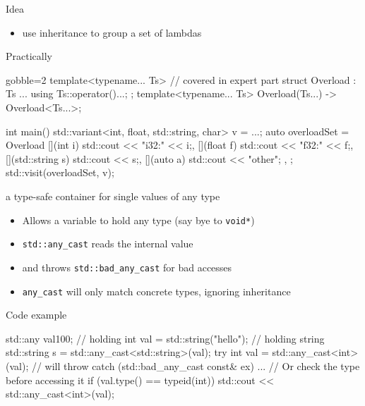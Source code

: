\begin{frame}[fragile]
  \begin{exampleblock}{Idea}
    \begin{itemize}
    \item use inheritance to group a set of lambdas
    \end{itemize}
  \end{exampleblock}
  \begin{block}{Practically}
    \small
    \begin{cppcode*}{gobble=2}
      template<typename... Ts> // covered in expert part
      struct Overload : Ts ... { using Ts::operator()...; };
      template<typename... Ts> Overload(Ts...) -> Overload<Ts...>;

      int main(){
        std::variant<int, float, std::string, char> v = ...;
        auto overloadSet = Overload {
          [](int i) { std::cout << "i32:" << i;},
          [](float f) { std::cout << "f32:" << f;},
          [](std::string s) { std::cout << s;},
          [](auto a) { std::cout << "other"; },
        };
        std::visit(overloadSet, v);
      }
    \end{cppcode*}
  \end{block}
\end{frame}

\begin{frame}[fragile]
  \begin{block}{a type-safe container for single values of any type}
    \begin{itemize}
    \item Allows a variable to hold any type (say bye to \texttt{void*})
    \item \texttt{std::any_cast} reads the internal value
    \item and throws \texttt{std::bad_any_cast} for bad accesses
    \item \texttt{any_cast} will only match concrete types, ignoring inheritance
    \end{itemize}
  \end{block}
  \begin{exampleblock}{Code example}
    \small
    \begin{cppcode*}{}
      std::any val{100};          // holding int
      val = std::string("hello"); // holding string
      std::string s = std::any_cast<std::string>(val);
      try {
        int val = std::any_cast<int>(val); // will throw
      } catch (std::bad_any_cast const& ex) {...}
      // Or check the type before accessing it
      if (val.type() == typeid(int))
        std::cout << std::any_cast<int>(val);
    \end{cppcode*}
  \end{exampleblock}
\end{frame}

